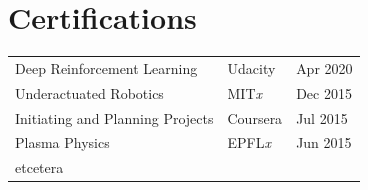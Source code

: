\documentclass[letterpaper]{deedy-resume} %
\begin{document}
\begin{minipage}[t]{0.66\textwidth}
\sectionspace %

\section{Certifications}

\begin{tabular}{lll}
 Deep Reinforcement Learning & Udacity & Apr 2020 \\
 Underactuated Robotics & MIT{\it x} & Dec 2015 \\
 Initiating and Planning Projects & Coursera & Jul 2015 \\
 Plasma Physics & EPFL{\it x} & Jun 2015 \\
 etcetera
\end{tabular}

\sectionspace %




\end{minipage} %








\end{document}
